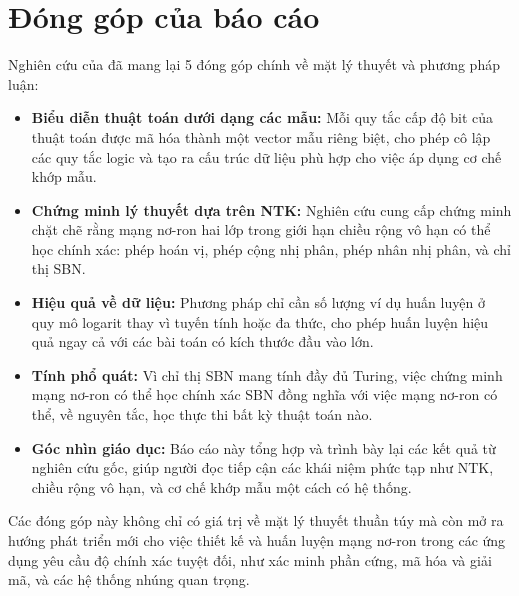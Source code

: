 \section{Đóng góp của báo cáo}

Nghiên cứu của đã mang lại 5 đóng góp chính về mặt lý thuyết và phương pháp luận:

\begin{itemize}
    \item \textbf{Biểu diễn thuật toán dưới dạng các mẫu:} Mỗi quy tắc cấp độ bit của thuật toán được mã hóa thành một vector mẫu riêng biệt, cho phép cô lập các quy tắc logic và tạo ra cấu trúc dữ liệu phù hợp cho việc áp dụng cơ chế khớp mẫu.
    
    \item \textbf{Chứng minh lý thuyết dựa trên NTK:} Nghiên cứu cung cấp chứng minh chặt chẽ rằng mạng nơ-ron hai lớp trong giới hạn chiều rộng vô hạn có thể học chính xác: phép hoán vị, phép cộng nhị phân, phép nhân nhị phân, và chỉ thị SBN.
    
    \item \textbf{Hiệu quả về dữ liệu:} Phương pháp chỉ cần số lượng ví dụ huấn luyện ở quy mô logarit thay vì tuyến tính hoặc đa thức, cho phép huấn luyện hiệu quả ngay cả với các bài toán có kích thước đầu vào lớn.
    
    \item \textbf{Tính phổ quát:} Vì chỉ thị SBN mang tính đầy đủ Turing, việc chứng minh mạng nơ-ron có thể học chính xác SBN đồng nghĩa với việc mạng nơ-ron có thể, về nguyên tắc, học thực thi bất kỳ thuật toán nào.
    
    \item \textbf{Góc nhìn giáo dục:} Báo cáo này tổng hợp và trình bày lại các kết quả từ nghiên cứu gốc, giúp người đọc tiếp cận các khái niệm phức tạp như NTK, chiều rộng vô hạn, và cơ chế khớp mẫu một cách có hệ thống.
\end{itemize}

Các đóng góp này không chỉ có giá trị về mặt lý thuyết thuần túy mà còn mở ra hướng phát triển mới cho việc thiết kế và huấn luyện mạng nơ-ron trong các ứng dụng yêu cầu độ chính xác tuyệt đối, như xác minh phần cứng, mã hóa và giải mã, và các hệ thống nhúng quan trọng.
